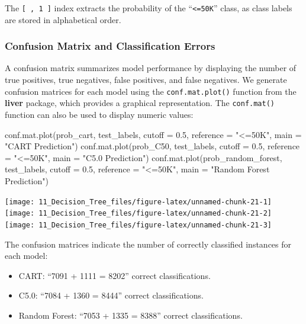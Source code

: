 \documentclass[
  11pt,
]{book}
\makeatletter
\newenvironment{Shaded}{}{}
\newcommand{\AttributeTok}[1]{#1}
\newcommand{\FloatTok}[1]{#1}
\newcommand{\FunctionTok}[1]{#1}
\newcommand{\NormalTok}[1]{#1}
\newcommand{\StringTok}[1]{\textcolor[rgb]{0.39,0.39,0.39}{#1}}
\providecommand{\tightlist}{%
  \setlength{\itemsep}{0pt}\setlength{\parskip}{0pt}}
\newenvironment{kframe}{%
\medskip{}
\setlength{\fboxsep}{.8em}
 \def\at@end@of@kframe{}%
 \ifinner\ifhmode%
  \def\at@end@of@kframe{\end{minipage}}%
  \begin{minipage}{\columnwidth}%
 \fi\fi%
 \def\FrameCommand##1{\hskip\@totalleftmargin \hskip-\fboxsep
 \colorbox{shadecolor}{##1}\hskip-\fboxsep
     \hskip-\linewidth \hskip-\@totalleftmargin \hskip\columnwidth}%
 \MakeFramed {\advance\hsize-\width
   \@totalleftmargin\z@ \linewidth\hsize
   \@setminipage}}%
 {\par\unskip\endMakeFramed%
 \at@end@of@kframe}
\renewenvironment{Shaded}{\begin{kframe}}{\end{kframe}}
\theoremstyle{definition}
\theoremstyle{definition}
\theoremstyle{definition}
\theoremstyle{definition}
\theoremstyle{remark}
\makeatother
\begin{document}
The \texttt{{[}\ ,\ 1\ {]}} index extracts the probability of the ``\texttt{\textless{}=50K}'' class, as class labels are stored in alphabetical order.

\subsubsection*{Confusion Matrix and Classification Errors}\label{confusion-matrix-and-classification-errors}


A confusion matrix summarizes model performance by displaying the number of true positives, true negatives, false positives, and false negatives. We generate confusion matrices for each model using the \texttt{conf.mat.plot()} function from the \textbf{liver} package, which provides a graphical representation. The \texttt{conf.mat()} function can also be used to display numeric values:

\begin{Shaded}
\begin{Highlighting}[]
\FunctionTok{conf.mat.plot}\NormalTok{(prob\_cart, test\_labels, }\AttributeTok{cutoff =} \FloatTok{0.5}\NormalTok{, }\AttributeTok{reference =} \StringTok{"\textless{}=50K"}\NormalTok{, }\AttributeTok{main =} \StringTok{"CART Prediction"}\NormalTok{)}
\FunctionTok{conf.mat.plot}\NormalTok{(prob\_C50, test\_labels, }\AttributeTok{cutoff =} \FloatTok{0.5}\NormalTok{, }\AttributeTok{reference =} \StringTok{"\textless{}=50K"}\NormalTok{, }\AttributeTok{main =} \StringTok{"C5.0 Prediction"}\NormalTok{)}
\FunctionTok{conf.mat.plot}\NormalTok{(prob\_random\_forest, test\_labels, }\AttributeTok{cutoff =} \FloatTok{0.5}\NormalTok{, }\AttributeTok{reference =} \StringTok{"\textless{}=50K"}\NormalTok{, }\AttributeTok{main =} \StringTok{"Random Forest Prediction"}\NormalTok{)}
\end{Highlighting}
\end{Shaded}

\texttt{[image: 11\_Decision\_Tree\_files/figure-latex/unnamed-chunk-21-1]} \texttt{[image: 11\_Decision\_Tree\_files/figure-latex/unnamed-chunk-21-2]} \texttt{[image: 11\_Decision\_Tree\_files/figure-latex/unnamed-chunk-21-3]}

The confusion matrices indicate the number of correctly classified instances for each model:

\begin{itemize}
\tightlist
\item
  CART: ``7091 + 1111 = 8202'' correct classifications.\\
\item
  C5.0: ``7084 + 1360 = 8444'' correct classifications.\\
\item
  Random Forest: ``7053 + 1335 = 8388'' correct classifications.
\end{itemize}
\end{document}
